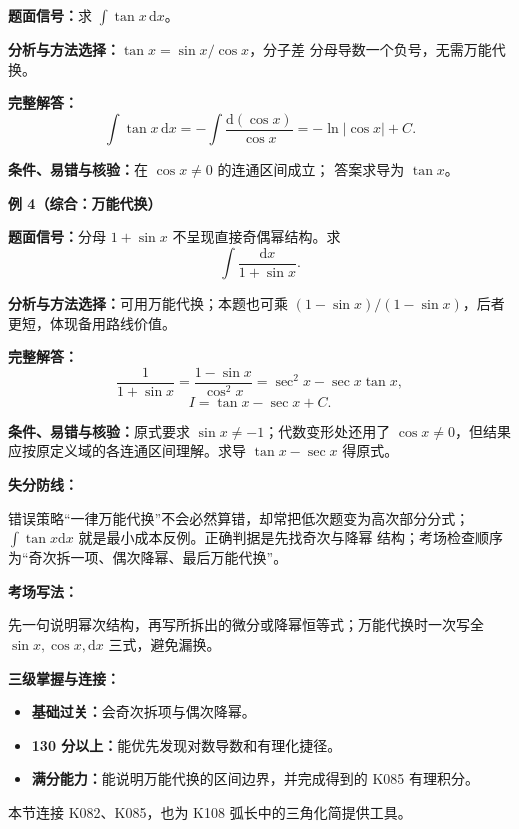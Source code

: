 \begin{knowledgeBox}
\textbf{题面信号：}求
\(\int\tan x\,\mathrm dx\)。

\textbf{分析与方法选择：}\(\tan x=\sin x/\cos x\)，分子差
分母导数一个负号，无需万能代换。

\textbf{完整解答：}
\[
\int\tan x\,\mathrm dx
=-\int\frac{\mathrm d(\cos x)}{\cos x}
=-\ln|\cos x|+C.
\]

\textbf{条件、易错与核验：}在 \(\cos x\ne0\) 的连通区间成立；
答案求导为 \(\tan x\)。

\textbf{例 4（综合：万能代换）}

\textbf{题面信号：}分母 \(1+\sin x\) 不呈现直接奇偶幂结构。求
\[
\int\frac{\mathrm dx}{1+\sin x}.
\]

\textbf{分析与方法选择：}可用万能代换；本题也可乘
\((1-\sin x)/(1-\sin x)\)，后者更短，体现备用路线价值。

\textbf{完整解答：}
\[
\frac1{1+\sin x}
=\frac{1-\sin x}{\cos^2x}
=\sec^2x-\sec x\tan x,
\]
\[
I=\tan x-\sec x+C.
\]

\textbf{条件、易错与核验：}原式要求 \(\sin x\ne-1\)；代数变形处还用了
\(\cos x\ne0\)，但结果应按原定义域的各连通区间理解。求导
\(\tan x-\sec x\) 得原式。

\textbf{失分防线：}

错误策略“一律万能代换”不会必然算错，却常把低次题变为高次部分分式；
\(\int\tan x\mathrm dx\) 就是最小成本反例。正确判据是先找奇次与降幂
结构；考场检查顺序为“奇次拆一项、偶次降幂、最后万能代换”。

\textbf{考场写法：}

先一句说明幂次结构，再写所拆出的微分或降幂恒等式；万能代换时一次写全
\(\sin x,\cos x,\mathrm dx\) 三式，避免漏换。

\textbf{三级掌握与连接：}
\begin{itemize}
  \item \textbf{基础过关：}会奇次拆项与偶次降幂。
  \item \textbf{130 分以上：}能优先发现对数导数和有理化捷径。
  \item \textbf{满分能力：}能说明万能代换的区间边界，并完成得到的
  K085 有理积分。
\end{itemize}
本节连接 K082、K085，也为 K108 弧长中的三角化简提供工具。
\end{knowledgeBox}


\par

